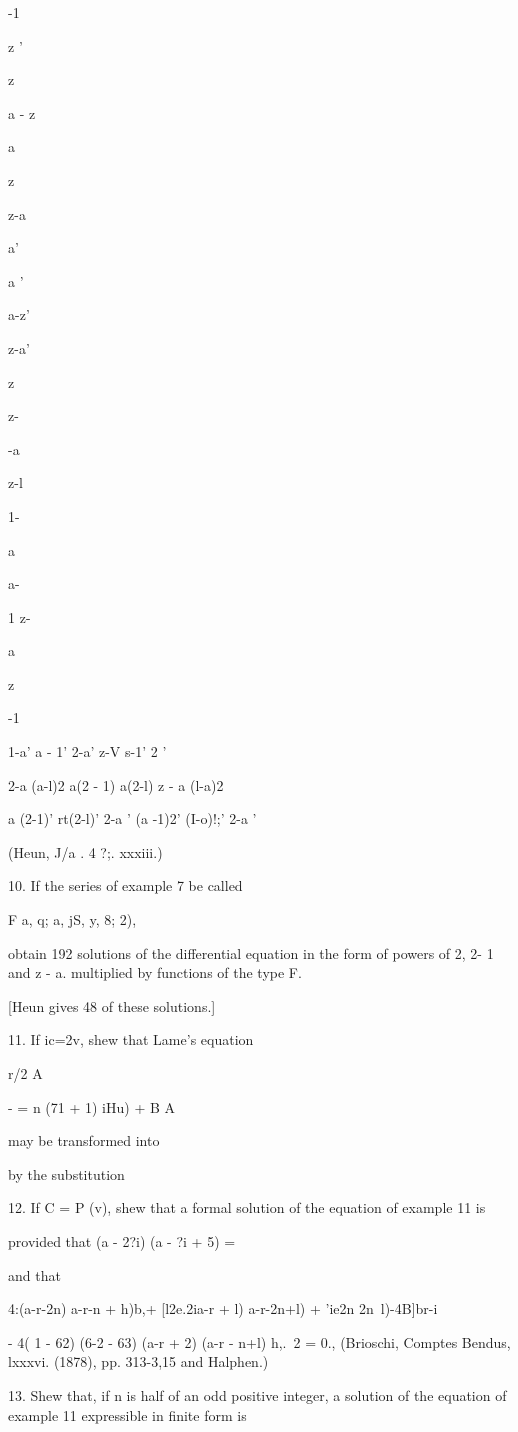 {{{{{{{{-1

z '

z

a - z

  

a

z

z-a

a'

a '

a-z'

z-a'

z

z-

-a

z-l

1-

 a

a-

1 z-

 a

z

-1

1-a' a - 1' 2-a' z-V s-1' 2 '

2-a (a-l)2 a(2 - 1) a(2-l) z - a (l-a)2

a (2-1)' rt(2-l)' 2-a ' (a -1)2' (I-o)!;' 2-a '

(Heun, J/a . 4 ?;. xxxiii.)

10. If the series of example 7 be called

F a, q; a, jS, y, 8; 2),

obtain 192 solutions of the differential equation in the form of
powers of 2, 2- 1 and z - a. multiplied by functions of the type F.

[Heun gives 48 of these solutions.]

11. If ic=2v, shew that Lame's equation

r/2 A

- = n (71 + 1) iHu) + B A

may be transformed into

by the substitution

12. If C = P (v), shew that a formal solution of the equation of
example 11 is

provided that (a - 2?i) (a - ?i + 5) =

and that

4:(a-r-2n) a-r-n + h)b,+ [l2e.2ia-r + l) a-r-2n+l) + 'ie2n
2n~l)-4B]br-i

- 4( 1 - 62) (6-2 - 63) (a-r + 2) (a-r - n+l) h,.\ 2 = 0., (Brioschi,
Comptes Bendus, lxxxvi. (1878), pp. 313-3,15 and Halphen.)

13. Shew that, if n is half of an odd positive integer, a solution of
the equation of example 11 expressible in finite form is

}}}}}}}}
